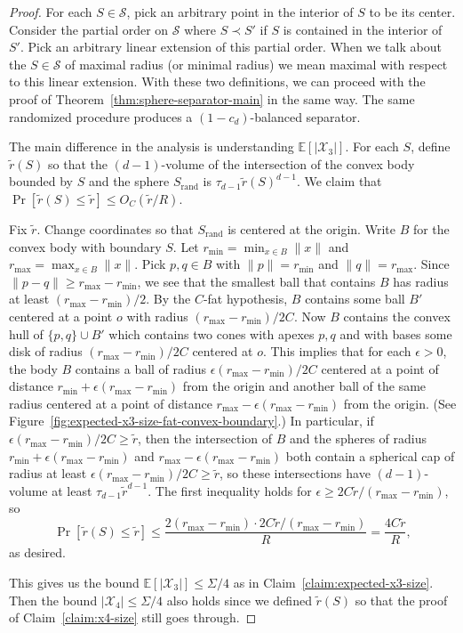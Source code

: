 \documentclass[11pt, reqno]{amsart}
\theoremstyle{plain}
\theoremstyle{definition}
\theoremstyle{remark}
\numberwithin{theorem}{section}
\numberwithin{equation}{section}
\newcommand{\E}{\mathbb E}
\newcommand{\fS}{\mathcal S}
\newcommand{\fX}{\mathcal X}
\begin{document}
\begin{proof}
For each $S\in\fS$, pick an arbitrary point in the interior of $S$ to be its center. Consider the partial order on $\fS$ where $S\prec S'$ if $S$ is contained in the interior of $S'$. Pick an arbitrary linear extension of this partial order. When we talk about the $S\in\fS$ of maximal radius (or minimal radius) we mean maximal with respect to this linear extension. With these two definitions, we can proceed with the proof of Theorem~\ref{thm:sphere-separator-main} in the same way. The same randomized procedure produces a $(1-c_d)$-balanced separator.

The main difference in the analysis is understanding $\E[|\fX_3|]$. For each $S$, define $\tilde r(S)$ so that the $(d-1)$-volume of the intersection of the convex body bounded by $S$ and the sphere $S_{\mathrm{rand}}$ is $\tau_{d-1}\tilde r(S)^{d-1}$. We claim that $\Pr[\tilde r(S)\leq \tilde r]\leq O_C(\tilde r/R)$. 

Fix $\tilde r$. Change coordinates so that $S_{\mathrm{rand}}$ is centered at the origin. Write $B$ for the convex body with boundary $S$.  Let $r_{\min}=\min_{x\in B}\|x\|$ and $r_{\max}=\max_{x\in B}\|x\|$. Pick $p,q\in B$ with $\|p\|=r_{\min}$ and $\|q\|=r_{\max}$. Since $\|p-q\|\geq r_{\max}-r_{\min}$, we see that the smallest ball that contains $B$ has radius at least $(r_{\max}-r_{\min})/2$. By the $C$-fat hypothesis, $B$ contains some ball $B'$ centered at a point $o$ with radius $(r_{\max}-r_{\min})/2C$. Now $B$ contains the convex hull of $\{p,q\}\cup B'$ which contains two cones with apexes $p,q$ and with bases some disk of radius $(r_{\max}-r_{\min})/2C$ centered at $o$. This implies that for each $\epsilon>0$, the body $B$ contains a ball of radius $\epsilon(r_{\max}-r_{\min})/2C$ centered at a point of distance $r_{\min}+\epsilon(r_{\max}-r_{\min})$ from the origin and another ball of the same radius centered at a point of distance $r_{\max}-\epsilon(r_{\max}-r_{\min})$ from the origin. (See Figure~\ref{fig:expected-x3-size-fat-convex-boundary}.) In particular, if $\epsilon(r_{\max}-r_{\min})/2C\geq \tilde r$, then the intersection of $B$ and the spheres of radius $r_{\min}+\epsilon(r_{\max}-r_{\min})$ and $r_{\max}-\epsilon(r_{\max}-r_{\min})$ both contain a spherical cap of radius at least $\epsilon(r_{\max}-r_{\min})/2C\geq \tilde r$, so these intersections have $(d-1)$-volume at least $\tau_{d-1}\tilde r^{d-1}$. The first inequality holds for $\epsilon\geq 2C\tilde r/(r_{\max}-r_{\min})$, so
\[\Pr[\tilde r(S)\leq \tilde r]\leq\frac{2(r_{\max}-r_{\min})\cdot 2C\tilde r/(r_{\max}-r_{\min})}{R}=\frac{4C\tilde r}{R},\]
as desired.

This gives us the bound $\E[|\fX_3|]\leq \Sigma/4$ as in Claim~\ref{claim:expected-x3-size}. Then the bound $|\fX_4|\leq \Sigma/4$ also holds since we defined $\tilde r(S)$ so that the proof of Claim~\ref{claim:x4-size} still goes through.
\end{proof}
\end{document}
